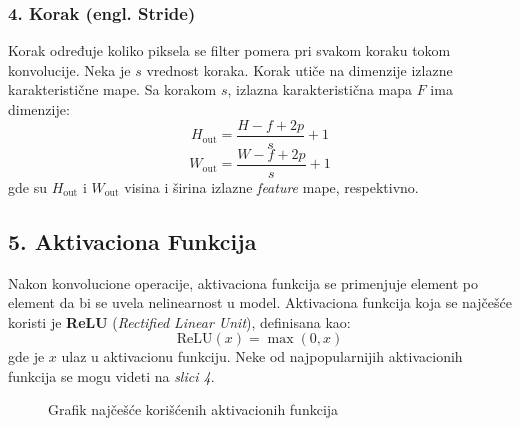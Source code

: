 \documentclass[12pt]{article}
\begin{document}
   \subsubsection*{4. Korak (engl. Stride)}
   Korak određuje koliko piksela se filter pomera pri svakom koraku tokom konvolucije. 
   Neka je \( s \) vrednost koraka. Korak utiče na dimenzije izlazne karakteristične mape. 
   Sa korakom \( s \), izlazna karakteristična mapa \( F \) ima dimenzije:
   \[
      H_{\text{out}} = \frac{H - f + 2p}{s} + 1
   \]
   \[
   W_{\text{out}} = \frac{W - f + 2p}{s} + 1
   \]
   gde su \( H_{\text{out}} \) i \( W_{\text{out}} \) visina i širina izlazne \textit{feature} mape, 
   respektivno.

   \subsection*{5. Aktivaciona Funkcija}

   Nakon konvolucione operacije, aktivaciona funkcija se primenjuje element po element da bi se 
   uvela nelinearnost u model. Aktivaciona funkcija koja se najčešće koristi je 
   \textbf{ReLU} (\textit{Rectified Linear Unit}), definisana kao:
   \[
   \text{ReLU}(x) = \max(0, x)
   \]
   gde je \( x \) ulaz u aktivacionu funkciju. Neke od najpopularnijih aktivacionih funkcija se mogu 
   videti na \textit{slici 4}.

   \begin{figure}[h!]
      \centering
      \caption{Grafik najčešće korišćenih aktivacionih funkcija}
      \label{fig:pop_activations}
    \end{figure}

    \newpage 
    
\end{document}
